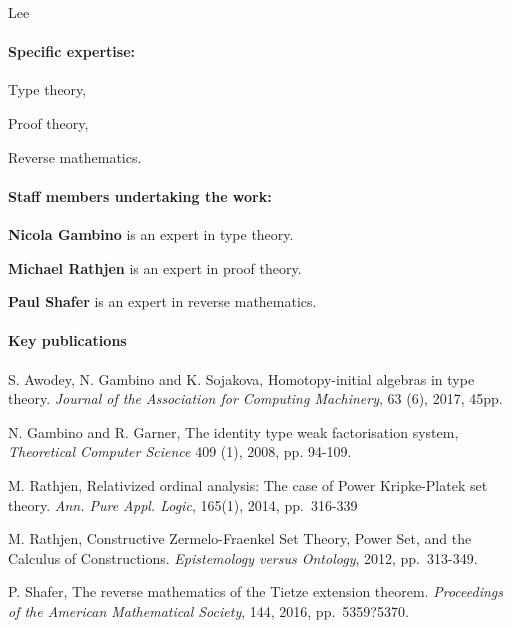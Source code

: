 \begin{sitedescription}{Lee}
\paragraph*{Specific expertise:}

\begin{compactitem}
\item Type theory,
\item Proof theory,
\item Reverse mathematics.
\end{compactitem}

\paragraph*{Staff members undertaking the work:}

\begin{compactitem}
\item \textbf{Nicola Gambino} is an expert in type theory.
\item \textbf{Michael Rathjen} is an expert in proof theory.
\item \textbf{Paul Shafer} is an expert in reverse mathematics.
\end{compactitem}


\paragraph*{Key publications} 

\begin{compactitem}
\item S. Awodey, N. Gambino and K. Sojakova, Homotopy-initial algebras in type theory. 
{\em Journal of the Association for Computing Machinery}, 63 (6), 2017, 45pp.
\item N. Gambino and R. Garner, The identity type weak factorisation system, 
{\em Theoretical Computer Science} 409 (1), 2008, pp. 94-109.
\item M. Rathjen, Relativized ordinal analysis: The case of Power Kripke-Platek set theory. 
{\em Ann. Pure Appl. Logic}, 165(1), 2014, pp.~316-339 
\item M. Rathjen,
Constructive Zermelo-Fraenkel Set Theory, Power Set, and the Calculus of Constructions. 
{\em Epistemology versus Ontology}, 2012, pp.~313-349. 
\item P. Shafer,
The reverse mathematics of the Tietze extension theorem.  
{\em Proceedings of the American Mathematical Society}, 144, 2016, pp.~5359?5370.
\end{compactitem}

\end{sitedescription}

